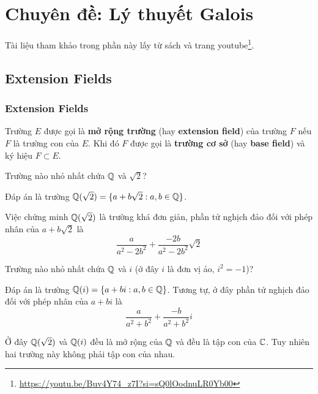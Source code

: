 \chapter{Chuyên đề: Lý thuyết Galois}

Tài liệu tham khảo trong phần này lấy từ sách \cite{Judson2012} và trang youtube\footnote{\url{https://youtu.be/Buv4Y74_z7I?si=sQ0lOodnuLR0Yb00}}.

\section{Extension Fields}

\subsection*{Extension Fields}

\begin{definition}
    Trường $E$ được gọi là \textbf{mở rộng trường} (hay \textbf{extension field}) của trường $F$ nếu $F$ là trường con của $E$. Khi đó $F$ được gọi là \textbf{trường cơ sở} (hay \textbf{base field}) và ký hiệu $F \subset E$.
\end{definition}

\begin{example}
    Trường nào nhỏ nhất chứa $\mathbb{Q}$ và $\sqrt{2}$?

    Đáp án là trường $\mathbb{Q}(\sqrt{2}) = \{ a + b \sqrt{2} : a, b \in \mathbb{Q} \}$.

    Việc chứng minh $\mathbb{Q}(\sqrt{2})$ là trường khá đơn giản, phần tử nghịch đảo đối với phép nhân của $a + b \sqrt{2}$ là
    \begin{equation*}
        \frac{a}{a^2 - 2 b^2} + \frac{-2b}{a^2 - 2 b^2} \sqrt{2}
    \end{equation*}
\end{example}

\begin{example}
    Trường nào nhỏ nhất chứa $\mathbb{Q}$ và $i$ (ở đây $i$ là đơn vị ảo, $i^2 = -1$)?

    Đáp án là trường $\mathbb{Q}(i) = \{ a + b i : a, b \in \mathbb{Q} \}$. Tương tự, ở đây phần tử nghịch đảo đối với phép nhân của $a + b i$ là
    \begin{equation*}
        \frac{a}{a^2 + b^2} + \frac{-b}{a^2 + b^2} i
    \end{equation*}
\end{example}

Ở đây $\mathbb{Q}(\sqrt{2})$ và $\mathbb{Q}(i)$ đều là mở rộng của $\mathbb{Q}$ và đều là tập con của $\mathbb{C}$. Tuy nhiên hai trường này không phải tập con của nhau.

